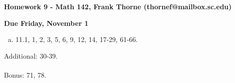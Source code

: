 \documentclass[12pt]{article}
\begin{document}
\setlength{\topmargin}{-2mm}





\begin{center}{\bf Homework 9 - Math 142, Frank Thorne (thornef@mailbox.sc.edu)}
\end{center}
\begin{center}
{\bf Due Friday, November 1}
\end{center}

\begin{enumerate}[(a)]
\item
11.1, 1, 2, 3, 5, 6, 9, 12, 14, 17-29, 61-66.

\end{enumerate}
Additional: 30-39.
\\
\\
Bonus: 71, 78.
\end{document}
